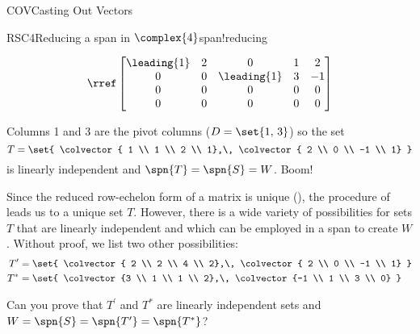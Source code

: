 \begin{subsect}{COV}{Casting Out Vectors}
\begin{example}{RSC4}{Reducing a span in $\complex{4}$}{span!reducing}
\begin{para}
\begin{equation*}
\rref
\begin{bmatrix}
 \leading{1} & 2 & 0 & 1 & 2 \\
 0 & 0 & \leading{1} & 3 & -1 \\
 0 & 0 & 0 & 0 & 0 \\
 0 & 0 & 0 & 0 & 0
\end{bmatrix}
\end{equation*}\end{para}
%
\begin{para}Columns 1 and 3 are the pivot columns ($D=\set{1,\,3}$) so the set
%
\begin{equation*}
T=\set{
\colvector{ 1 \\ 1 \\ 2 \\ 1},\,
\colvector{ 2 \\ 0 \\ -1 \\ 1}
}
\end{equation*}
%
is linearly independent and $\spn{T}=\spn{S}=W$.  Boom!\end{para}
%
\begin{para}Since the reduced row-echelon form of a matrix is unique (), the procedure of  leads us to a unique set $T$.  However, there is a wide variety of possibilities for sets $T$ that are linearly independent and which can be employed in a span to create $W$.  Without proof, we list two other possibilities:
%
\begin{align*}
T^{\prime}&=\set{
\colvector{ 2 \\ 2 \\ 4 \\ 2},\,
\colvector{ 2 \\ 0 \\ -1 \\ 1}
}\\
T^{*}&=\set{
\colvector{3 \\ 1 \\ 1 \\ 2},\,
\colvector{-1 \\ 1 \\ 3 \\ 0}
}
\end{align*}
\end{para}
%
\begin{para}Can you prove that $T^{\prime}$ and $T^{*}$ are linearly independent sets and $W=\spn{S}=\spn{T^{\prime}}=\spn{T^{*}}$?\end{para}
%
\end{example}

\end{subsect}
